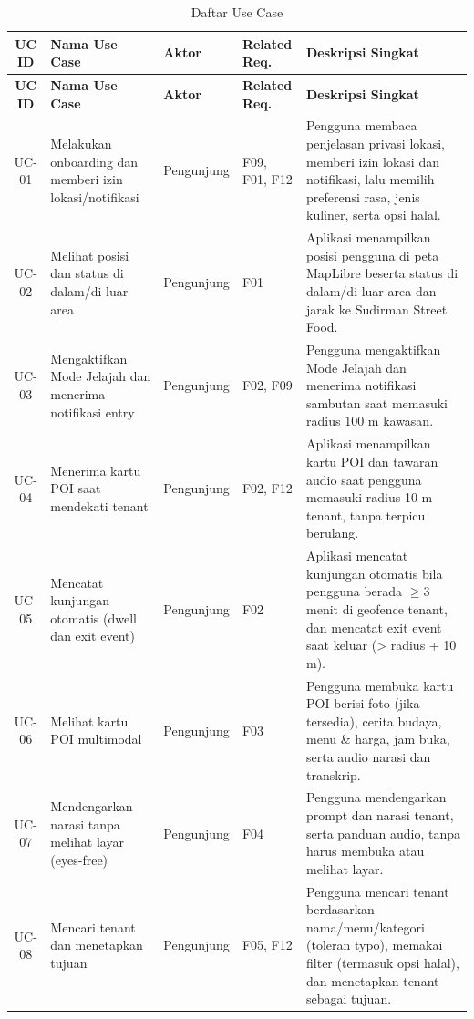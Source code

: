 \begin{longtable}{|C{0.10}|L{0.25}|L{0.14}|L{0.13}|L{0.38}|}
\caption{Daftar Use Case}\\
\hline
{}\textbf{UC ID} & \textbf{Nama Use Case} & \textbf{Aktor} & \textbf{Related Req.} & \textbf{Deskripsi Singkat} \\ \hline
\endfirsthead
\hline
{}\textbf{UC ID} & \textbf{Nama Use Case} & \textbf{Aktor} & \textbf{Related Req.} & \textbf{Deskripsi Singkat} \\ \hline
\endhead
UC-01 & Melakukan onboarding dan memberi izin lokasi/notifikasi & Pengunjung & F09, F01, F12 & Pengguna membaca penjelasan privasi lokasi, memberi izin lokasi dan notifikasi, lalu memilih preferensi rasa, jenis kuliner, serta opsi halal. \\ \hline
UC-02 & Melihat posisi dan status di dalam/di luar area & Pengunjung & F01 & Aplikasi menampilkan posisi pengguna di peta MapLibre beserta status di dalam/di luar area dan jarak ke Sudirman Street Food. \\ \hline
UC-03 & Mengaktifkan Mode Jelajah dan menerima notifikasi entry & Pengunjung & F02, F09 & Pengguna mengaktifkan Mode Jelajah dan menerima notifikasi sambutan saat memasuki radius 100 m kawasan. \\ \hline
UC-04 & Menerima kartu POI saat mendekati tenant & Pengunjung & F02, F12 & Aplikasi menampilkan kartu POI dan tawaran audio saat pengguna memasuki radius 10 m tenant, tanpa terpicu berulang. \\ \hline
UC-05 & Mencatat kunjungan otomatis (dwell dan exit event) & Pengunjung & F02 & Aplikasi mencatat kunjungan otomatis bila pengguna berada \(\ge\)3 menit di geofence tenant, dan mencatat exit event saat keluar (> radius + 10 m). \\ \hline
UC-06 & Melihat kartu POI multimodal & Pengunjung & F03 & Pengguna membuka kartu POI berisi foto (jika tersedia), cerita budaya, menu \& harga, jam buka, serta audio narasi dan transkrip. \\ \hline
UC-07 & Mendengarkan narasi tanpa melihat layar (eyes-free) & Pengunjung & F04 & Pengguna mendengarkan prompt dan narasi tenant, serta panduan audio, tanpa harus membuka atau melihat layar. \\ \hline
UC-08 & Mencari tenant dan menetapkan tujuan & Pengunjung & F05, F12 & Pengguna mencari tenant berdasarkan nama/menu/kategori (toleran typo), memakai filter (termasuk opsi halal), dan menetapkan tenant sebagai tujuan. \\ \hline

\end{longtable}
